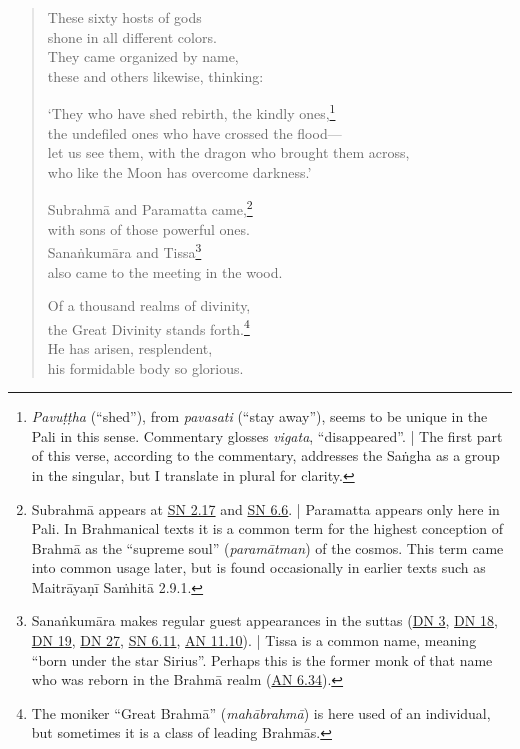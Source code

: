 \documentclass[12pt,openany]{book}%
\begin{document}
\begin{verse}
These sixty hosts of gods \\
shone in all different colors. \\
They came organized by name, \\
these and others likewise, thinking: 

‘They who have shed rebirth, the kindly ones,\footnote{\textit{\textsanskrit{Pavuṭṭha}} (“shed”), from \textit{pavasati} (“stay away”), seems to be unique in the Pali in this sense. Commentary glosses \textit{vigata}, “disappeared”. | The first part of this verse, according to the commentary, addresses the \textsanskrit{Saṅgha} as a group in the singular, but I translate in plural for clarity. } \\
the undefiled ones who have crossed the flood—\\
let us see them, with the dragon who brought them across, \\
who like the Moon has overcome darkness.’ 

\textsanskrit{Subrahmā} and Paramatta came,\footnote{\textsanskrit{Subrahmā} appears at \href{https://suttacentral.net/sn2.17/en/sujato}{SN 2.17} and \href{https://suttacentral.net/sn6.6/en/sujato}{SN 6.6}. | Paramatta appears only here in Pali. In Brahmanical texts it is a common term for the highest conception of \textsanskrit{Brahmā} as the “supreme soul” (\textit{\textsanskrit{paramātman}}) of the cosmos. This term came into common usage later, but is found occasionally in earlier texts such as \textsanskrit{Maitrāyaṇī} \textsanskrit{Saṁhitā} 2.9.1. } \\
with sons of those powerful ones. \\
\textsanskrit{Sanaṅkumāra} and Tissa\footnote{\textsanskrit{Sanaṅkumāra} makes regular guest appearances in the suttas (\href{https://suttacentral.net/dn3/en/sujato}{DN 3}, \href{https://suttacentral.net/dn18/en/sujato}{DN 18}, \href{https://suttacentral.net/dn19/en/sujato}{DN 19}, \href{https://suttacentral.net/dn27/en/sujato}{DN 27}, \href{https://suttacentral.net/sn6.11/en/sujato}{SN 6.11}, \href{https://suttacentral.net/an11.10/en/sujato}{AN 11.10}). | Tissa is a common name, meaning “born under the star Sirius”. Perhaps this is the former monk of that name who was reborn in the \textsanskrit{Brahmā} realm (\href{https://suttacentral.net/an6.34/en/sujato}{AN 6.34}). } \\
also came to the meeting in the wood. 

Of a thousand realms of divinity, \\
the Great Divinity stands forth.\footnote{The moniker “Great \textsanskrit{Brahmā}” (\textit{\textsanskrit{mahābrahmā}}) is here used of an individual, but sometimes it is a class of leading \textsanskrit{Brahmās}. } \\
He has arisen, resplendent, \\
his formidable body so glorious. 


\end{verse}
\end{document}
